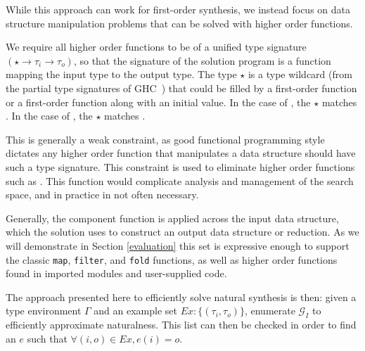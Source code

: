 While this approach can work for first-order synthesis, we instead focus on data structure manipulation problems that can be solved with higher order functions.

We require all higher order functions to be of a unified type signature $(\star \to \tau_i \to \tau_o)$, so that the signature of the solution program is a function mapping the input type to the output type. 
The type $\star$ is a type wildcard (from the partial type signatures of GHC~\cite{ghc}) that could be filled by a first-order function or a first-order function along with an initial value.
In the case of , the $\star$ matches .
In the case of , the $\star$ matches .

This is generally a weak constraint, as good functional programming style dictates any higher order function that manipulates a data structure should have such a type signature.
This constraint is used to eliminate higher order functions such as .
This function would complicate analysis and management of the search space, and in practice in not often necessary.




Generally, the component function is applied across the \textsf{input} data structure, which the \textsf{solution} uses to construct an \textsf{output} data structure or reduction.
As we will demonstrate in Section \ref{evaluation} this set is expressive enough to support the classic \texttt{map}, \texttt{filter}, and \texttt{fold} functions, as well as higher order functions found in imported modules and user-supplied code.

The approach presented here to efficiently solve natural synthesis is then: given a type environment $\Gamma$ and an example set $Ex:\{(\tau_i,\tau_o)\}$, enumerate $\mathcal{G}_I$ to efficiently approximate naturalness.
This list can then be checked in order to find an $e$ such that $\forall (i,o) \in Ex, e (i) = o$.
